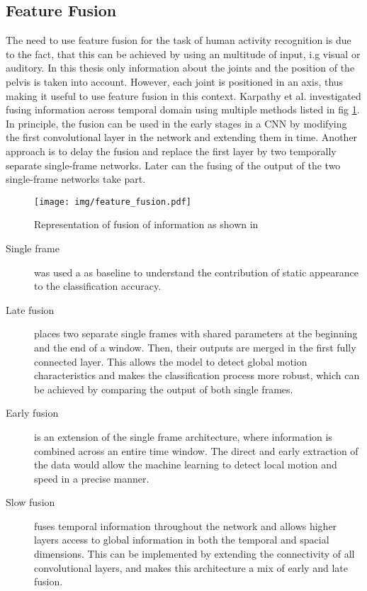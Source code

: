 \subsection{Feature Fusion}\label{subsec:feature-fusion}
The need to use feature fusion for the task of human activity recognition is due to the fact, that this can be achieved by using an multitude of input, i.g visual or auditory. In this thesis only information about the joints and the position of the pelvis is taken into account. However, each joint is positioned in an axis, thus making it useful to use feature fusion in this context. Karpathy et al. investigated fusing information across temporal domain using multiple methods listed in fig \ref{fig:feature_fusion}. In principle, the fusion can be used in the early stages in a CNN by modifying the first convolutional layer in the network and extending them in time. Another approach is to delay the fusion and replace the first layer by two temporally separate single-frame networks. Later can the fusing of the output of the two single-frame networks take part\cite{karpathy2014large}.\newline
\begin{figure}[H]
	\begin{center}
		\texttt{[image: img/feature\_fusion.pdf]}
		\caption{Representation of fusion of information as shown in \cite{karpathy2014large}}
		\label{fig:feature_fusion}
	\end{center}
\end{figure}
\begin{description}
	\item[Single frame] was used a as baseline to understand the contribution of static appearance to the classification accuracy\cite{karpathy2014large}.
	\item[Late fusion] places two separate single frames with shared parameters at the beginning and the end of a window. Then, their outputs are merged in the first fully connected layer. This allows the model to detect global motion characteristics and makes the classification process more robust, which can be achieved by comparing the output of both single frames\cite{karpathy2014large}.
	\item[Early fusion] is an extension of the single frame architecture, where information is combined across an entire time window. The direct and early extraction of the data would allow the machine learning to detect local motion and speed in a precise manner\cite{karpathy2014large}.
	\item[Slow fusion] fuses temporal information throughout the network and allows higher layers access to global information in both the temporal and spacial dimensions. This can be implemented by extending the connectivity of all convolutional layers, and makes this architecture a mix of early and late fusion\cite{karpathy2014large}.
\end{description}
